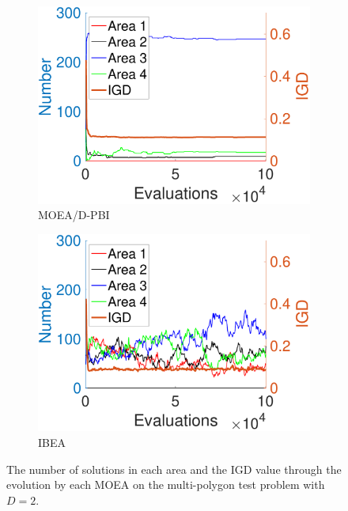 \documentclass[conference]{IEEEtran}
\begin{document}
\begin{figure}[t!]
    \begin{subfigure}[b]{.24\textwidth}
    \includegraphics[width=\linewidth]{Section5/dim2/Diversity/MOEAD_PBI}
    \caption{MOEA/D-PBI}
    \label{fig: MOEA/D-PBI Diversity dim=2}
    \end{subfigure}
    \begin{subfigure}[b]{.24\textwidth}
    \includegraphics[width=\linewidth]{Section5/dim2/Diversity/IBEA}
    \caption{IBEA}
    \end{subfigure}

    \caption{The number of solutions in each area and the IGD value through the evolution by each MOEA on the multi-polygon test problem with $D=2$.}
    \label{fig: MOEAs Diversity dim=2}
\end{figure}
\end{document}
